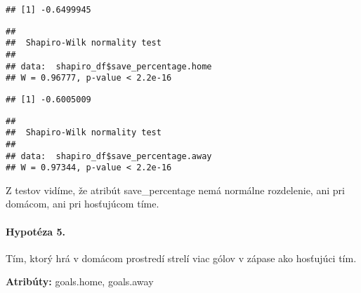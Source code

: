 \documentclass[
]{article}
\newenvironment{Shaded}{\begin{snugshade}}{\end{snugshade}}
\newcommand{\FunctionTok}[1]{\textcolor[rgb]{0.00,0.00,0.00}{#1}}
\newcommand{\NormalTok}[1]{#1}
\newcommand{\SpecialCharTok}[1]{\textcolor[rgb]{0.00,0.00,0.00}{#1}}
\begin{document}
\begin{verbatim}
## [1] -0.6499945
\end{verbatim}

\begin{Shaded}
\end{Shaded}

\begin{verbatim}
## 
##  Shapiro-Wilk normality test
## 
## data:  shapiro_df$save_percentage.home
## W = 0.96777, p-value < 2.2e-16
\end{verbatim}

\begin{Shaded}
\end{Shaded}

\begin{verbatim}
## [1] -0.6005009
\end{verbatim}

\begin{Shaded}
\end{Shaded}

\begin{verbatim}
## 
##  Shapiro-Wilk normality test
## 
## data:  shapiro_df$save_percentage.away
## W = 0.97344, p-value < 2.2e-16
\end{verbatim}

Z testov vidíme, že atribút save\_percentage nemá normálne rozdelenie,
ani pri domácom, ani pri hosťujúcom tíme.

\hypertarget{hypotuxe9za-5.}{%
\paragraph{Hypotéza 5.}\label{hypotuxe9za-5.}}

Tím, ktorý hrá v domácom prostredí strelí viac gólov v zápase ako
hosťujúci tím.

\textbf{Atribúty:} goals.home, goals.away
\end{document}
